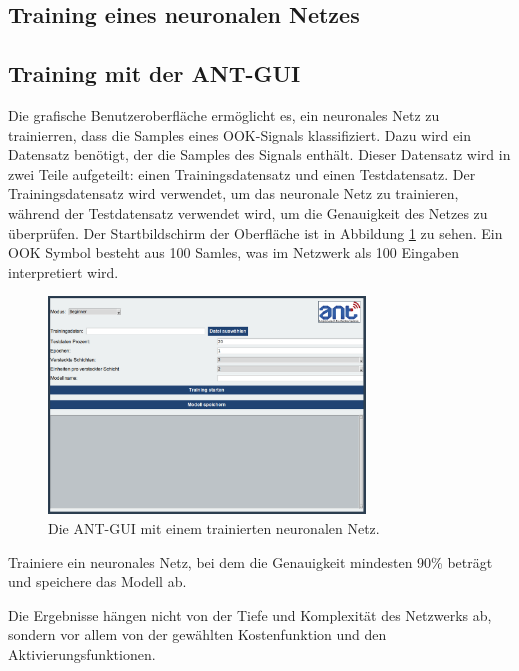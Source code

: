 \subsection{Training eines neuronalen Netzes}



\subsection{Training mit der ANT-GUI}

Die grafische Benutzeroberfläche ermöglicht es, ein neuronales Netz zu trainierren, dass die Samples eines OOK-Signals klassifiziert. Dazu wird ein Datensatz benötigt, der die Samples des Signals enthält. Dieser Datensatz wird in zwei Teile aufgeteilt: einen Trainingsdatensatz und einen Testdatensatz. Der Trainingsdatensatz wird verwendet, um das neuronale Netz zu trainieren, während der Testdatensatz verwendet wird, um die Genauigkeit des Netzes zu überprüfen.
Der Startbildschirm der Oberfläche ist in Abbildung \ref{fig:ant_gui} zu sehen. Ein OOK Symbol besteht aus 100 Samles, was im Netzwerk als 100 Eingaben interpretiert wird. 


\begin{figure}[h]
    \centering
    \includegraphics[width=0.75\textwidth]{images/GUI_start.png}
    \caption{Die ANT-GUI mit einem trainierten neuronalen Netz.}
    \label{fig:ant_gui}
\end{figure}

\begin{aufgabe}
    Trainiere ein neuronales Netz, bei dem die Genauigkeit mindesten 90\% beträgt und speichere das Modell ab.
\end{aufgabe}

\begin{lösung}
    Die Ergebnisse hängen nicht von der Tiefe und Komplexität des Netzwerks ab, sondern vor allem von der gewählten Kostenfunktion und den Aktivierungsfunktionen.
\end{lösung}

